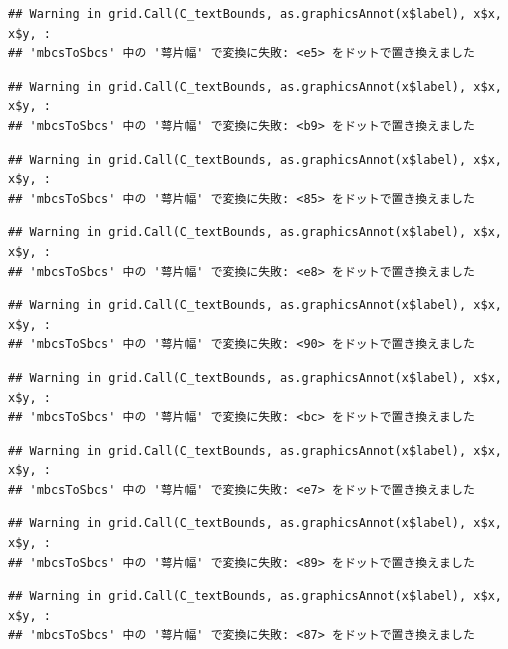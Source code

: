 \documentclass[
]{book}
\begin{document}
\begin{verbatim}
## Warning in grid.Call(C_textBounds, as.graphicsAnnot(x$label), x$x, x$y, :
## 'mbcsToSbcs' 中の '萼片幅' で変換に失敗: <e5> をドットで置き換えました
\end{verbatim}

\begin{verbatim}
## Warning in grid.Call(C_textBounds, as.graphicsAnnot(x$label), x$x, x$y, :
## 'mbcsToSbcs' 中の '萼片幅' で変換に失敗: <b9> をドットで置き換えました
\end{verbatim}

\begin{verbatim}
## Warning in grid.Call(C_textBounds, as.graphicsAnnot(x$label), x$x, x$y, :
## 'mbcsToSbcs' 中の '萼片幅' で変換に失敗: <85> をドットで置き換えました
\end{verbatim}

\begin{verbatim}
## Warning in grid.Call(C_textBounds, as.graphicsAnnot(x$label), x$x, x$y, :
## 'mbcsToSbcs' 中の '萼片幅' で変換に失敗: <e8> をドットで置き換えました
\end{verbatim}

\begin{verbatim}
## Warning in grid.Call(C_textBounds, as.graphicsAnnot(x$label), x$x, x$y, :
## 'mbcsToSbcs' 中の '萼片幅' で変換に失敗: <90> をドットで置き換えました
\end{verbatim}

\begin{verbatim}
## Warning in grid.Call(C_textBounds, as.graphicsAnnot(x$label), x$x, x$y, :
## 'mbcsToSbcs' 中の '萼片幅' で変換に失敗: <bc> をドットで置き換えました
\end{verbatim}

\begin{verbatim}
## Warning in grid.Call(C_textBounds, as.graphicsAnnot(x$label), x$x, x$y, :
## 'mbcsToSbcs' 中の '萼片幅' で変換に失敗: <e7> をドットで置き換えました
\end{verbatim}

\begin{verbatim}
## Warning in grid.Call(C_textBounds, as.graphicsAnnot(x$label), x$x, x$y, :
## 'mbcsToSbcs' 中の '萼片幅' で変換に失敗: <89> をドットで置き換えました
\end{verbatim}

\begin{verbatim}
## Warning in grid.Call(C_textBounds, as.graphicsAnnot(x$label), x$x, x$y, :
## 'mbcsToSbcs' 中の '萼片幅' で変換に失敗: <87> をドットで置き換えました
\end{verbatim}
\end{document}
